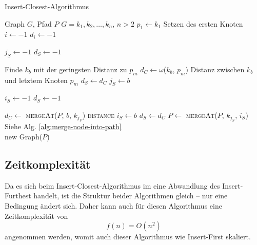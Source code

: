 \begin{algorithm}
    \caption{Insert-Closest-Algorithmus}
    \label{alg:insert-closest}
    \begin{algorithmic}[1]
        \Require Graph $G$, Pfad $P$
        \Require $G = k_1,k_2,\ldots,k_n$, $n > 2$
        \State $p_1 \gets k_1$
        \Comment Setzen des ersten Knoten
        \State $i \gets -1$
        \State $d_i \gets -1$

            \State $j_S \gets -1$
            \State $d_S \gets -1$

                \Comment Finde $k_b$ mit der geringsten Distanz zu $p_m$
                \State $d_C \gets \omega$($k_b$, $p_m$)
                \Comment Distanz zwischen $k_b$ und letztem Knoten $p_m$
                    \State $d_S \gets d_C$
                    \State $j_S \gets b$
                \EndIf
            \EndFor

            \State $i_S \gets -1$
            \State $d_S \gets -1$

                \State $d_C \gets$ \textsc{mergeAt}($P$, $b$, $k_{j_F}$) \textsc{distance}
                    \State $i_S \gets b$
                    \State $d_S \gets d_C$
                \EndIf
            \EndFor
            \State $P \gets$ \textsc{mergeAt}($P$, $k_{j_S}$, $i_S$)
            \Comment Siehe Alg. \vref{alg:merge-node-into-path}
        \EndFor \\
        \Return new Graph($P$)
    \end{algorithmic}
\end{algorithm}

\subsection{Zeitkomplexität}
Da es sich beim Insert-Closest-Algorithmus im eine Abwandlung des Insert-Furthest handelt, ist die Struktur beider Algorithmen gleich -- nur eine Bedingung ändert sich.
Daher kann auch für diesen Algorithmus eine Zeitkomplexität von 
$$f(n) = O(n^2)$$ 
angenommen werden, womit auch dieser Algorithmus wie Insert-First skaliert.

